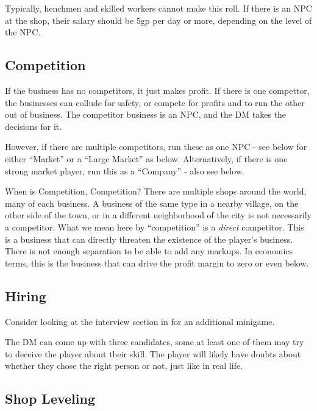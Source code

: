 \documentclass[twocolumn]{dndbook}
\begin{document}
Typically, henchmen and skilled workers cannot make this roll. If there is an NPC at the shop,
their salary should be 5gp per day or more, depending on the level of the NPC.

\subsection{Competition}
If the business has no competitors, it just makes profit.
If there is one compettor, the businesses can collude for safety, or compete for profits
and to run the other out of business. The competitor business is an NPC,
and the DM takes the decisions for it.\par

However, if there are multiple competitors, run these as one NPC - see below
for either ``Market'' or a ``Large Market'' as below.
Alternatively, if there is one strong
market player, run this as a ``Company'' - also see below.

\begin{DndSidebar}[float=!b]{When is Competition, Competition?}
	There are multiple shops around the world, many of each business.
	A business of the same type in a nearby village, on the other side of the town,
	or in a different neighborhood of the city is not necessarily a competitor.
	What we mean here by ``competition'' is a \emph{direct} competitor.
	This is a business that can directly threaten the existence of the player's business.
	There is not enough separation to be able to add any markups.
	In economics terms, this is the business that can drive the profit margin to zero or even below.
\end{DndSidebar}


\subsection{Hiring}

Consider looking at the interview section in 
for an additional minigame.\par

The DM can come up with three candidates, some at least one of them may try to deceive the player about their skill.
The player will likely have doubts about whether they chose the right person or not, just like in real life.\par

\subsection{Shop Leveling}
\end{document}
